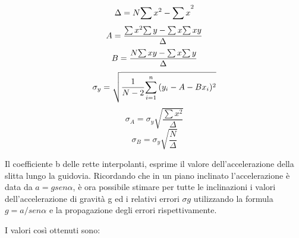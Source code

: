 \documentclass[a4paper,11pt,titlepage]{book}
\begin{document}
\begin{equation}
\Delta=N{{\sum{{x}^2}}-{\sum{x}}^2}\\
\end{equation}
\vspace{0.2cm}
\begin{equation}
A=\dfrac{{\sum{{x}^2}}{\sum{y}}-{\sum{x}}{\sum{xy}}}{\Delta}\\
\end{equation}
\vspace{0.2cm}
\begin{equation}
B=\dfrac{N{\sum{xy}}-{\sum{x}}{\sum{y}}}{\Delta}\\
\end{equation}
\vspace{0.2cm}
\begin{equation}
\sigma_y=\sqrt{{\dfrac{1}{N-2}}{\sum\limits_{i=1}^n{({y_i}-{A}-{Bx_i})^2}}}\\
\end{equation}
\vspace{0.2cm}
\begin{equation}
\sigma_A=\sigma_y{\sqrt{\dfrac{\sum{{x}^2}}{\Delta}}}
\end{equation}
\vspace{0.2cm}
\begin{equation}
\sigma_B=\sigma_y\sqrt{\dfrac{N}{\Delta}}
\end{equation}

\vspace{1cm}









\begin{flushleft}
Il coefficiente b delle rette interpolanti, esprime il valore dell’accelerazione della slitta lungo la guidovia. Ricordando che in un piano inclinato l’accelerazione è data da $a=gsen\alpha$, è ora possibile stimare per tutte le inclinazioni i valori dell’accelerazione di gravità g ed i relativi errori $\sigma{g}$ utilizzando la formula $g=a/sen\alpha$ e la propagazione degli errori rispettivamente.
\end{flushleft}




\newpage
\begin{flushleft}
I valori così ottenuti sono: 
\end{flushleft}
\vspace{1cm}
\end{document}
